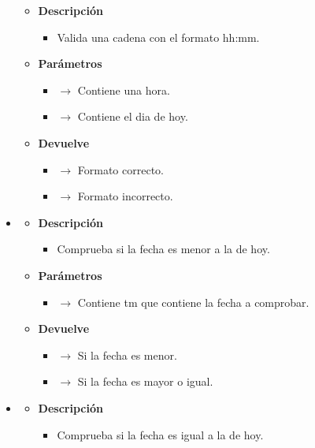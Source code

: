 \begin{itemize}
\begin{itemize}
         \item \textbf{Descripción}
         \begin{itemize}
 			\item Valida una cadena con el formato hh:mm.
 		\end{itemize}
 		\item \textbf{Parámetros}
 		\begin{itemize}
 			\item {} $\rightarrow$ Contiene una hora.
            \item {} $\rightarrow$ Contiene el dia de hoy.
 		\end{itemize}
         \item \textbf{Devuelve}
 		\begin{itemize}
 			\item {} $\rightarrow$ Formato correcto.
             \item {} $\rightarrow$ Formato incorrecto.
 		\end{itemize}
 	\end{itemize}
    \item {}
     \begin{itemize}
         \item \textbf{Descripción}
         \begin{itemize}
 			\item Comprueba si la fecha es menor a la de hoy.
 		\end{itemize}
 		\item \textbf{Parámetros}
 		\begin{itemize}
 			\item {} $\rightarrow$ Contiene tm que contiene la fecha a comprobar.
 		\end{itemize}
         \item \textbf{Devuelve}
 		\begin{itemize}
 			\item {} $\rightarrow$ Si la fecha es menor.
             \item {} $\rightarrow$ Si la fecha es mayor o igual.
 		\end{itemize}
 	\end{itemize}
    \item {}
     \begin{itemize}
         \item \textbf{Descripción}
         \begin{itemize}
 			\item Comprueba si la fecha es igual a la de hoy.

\end{itemize}
\end{itemize}
\end{itemize}
